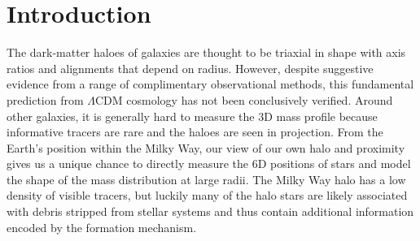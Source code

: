 %
%

\section{Introduction}\label{sec:introduction}

The dark-matter haloes of galaxies are thought to be triaxial in shape with axis
ratios and alignments that depend on radius. However, despite suggestive
evidence from a range of complimentary observational methods, this fundamental
prediction from $\Lambda$CDM cosmology has not been conclusively verified.
Around other galaxies, it is generally hard to measure the 3D mass profile
because informative tracers are rare and the haloes are seen in projection. From
the Earth's position within the Milky Way, our view of our own halo and
proximity gives us a unique chance to directly measure the 6D positions of stars
and model the shape of the mass distribution at large radii. The Milky Way halo
has a low density of visible tracers, but luckily many of the halo stars are
likely associated with debris stripped from stellar systems and thus contain
additional information encoded by the formation mechanism.

